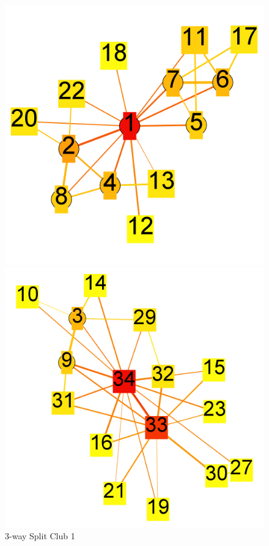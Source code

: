 \documentclass[paper=a4, fontsize=11pt]{scrartcl} %
\numberwithin{equation}{section} %
\numberwithin{figure}{section} %
\numberwithin{table}{section} %
\begin{document}
\begin{figure}[H]
\centering
\begin{minipage}{.3\textwidth}
  \centering
\includegraphics[width=1\textwidth]{3clubs/club1}
\caption{3-way Split Club 1}
\label{fig:3clubs1}
\end{minipage}%
\begin{minipage}{.4\textwidth}
  \centering
\includegraphics[width=1\textwidth]{3clubs/club2}

\end{minipage}
\end{figure}
\end{document}
